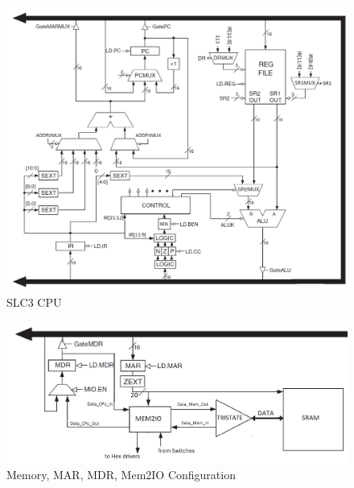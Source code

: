 \documentclass[journal, twocolumn, final,11pt,letterpaper]{IEEEtran}
\begin{document}
\begin{figure} [htbp]
	\centering
	\includegraphics[scale=0.27]{SLC3_Circuit.png}
	\caption{SLC3 CPU \label{fig:SLC3-Circuit}}
\end{figure}

\begin{figure} [htbp]
	\centering
	\includegraphics[scale=0.4]{Memory_Circuit.png}
	\caption{Memory, MAR, MDR, Mem2IO Configuration\label{fig:Memory-Circuit}}
\end{figure}


\end{document}
